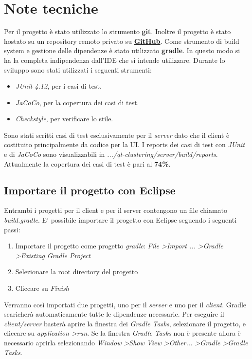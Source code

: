 \documentclass{article}
\begin{document}
	\section{Note tecniche}
	Per il progetto è stato utilizzato lo strumento \textbf{git}. Inoltre
	il progetto è stato hostato su un repository remoto privato su
	\href{https://github.com}{\textbf{GitHub}}. Come strumento di build
	system e gestione delle dipendenze è stato utilizzato \textbf{gradle}.
	In questo modo si ha la completa indipendenza dall'IDE che si intende
	utilizzare. 
	Durante lo sviluppo sono stati utilizzati i seguenti strumenti:
	\begin{itemize}
		\item \textit{JUnit 4.12}, per i casi di test.
		\item \textit{JaCoCo}, per la copertura dei casi di test.
		\item \textit{Checkstyle}, per verificare lo stile.
	\end{itemize}
	Sono stati scritti casi di test esclusivamente per il \textit{server}
	dato che il client è costituito principalmente da codice per la UI.
	I reports dei casi di test con \textit{JUnit} e di \textit{JaCoCo} sono
	visualizzabili in \textit{.../qt-clustering/server/build/reports}.
	Attualmente la copertura dei casi di test è pari al \textbf{74\%}.

	\subsection {Importare il progetto con Eclipse}
	Entrambi i progetti per il client e per il server contengono un file
	chiamato \textit{build.gradle}. E' possibile importare il progetto con
	Eclipse seguendo i seguenti passi:
	\begin{enumerate}
		\item Importare il progetto come progetto \textit{gradle}:
			\textit{File \textgreater Import ... \textgreater Gradle
			\textgreater Existing Gradle Project}
		\item Selezionare la root directory del progetto
		\item Cliccare su \textit{Finish}
	\end{enumerate}
	Verranno così importati due progetti, uno per il \textit{server} e uno
	per il \textit{client}. Gradle scaricherà automaticamente tutte le
	dipendenze necessarie. Per eseguire il \textit{client/server} basterà
	aprire la finestra dei \textit{Gradle Tasks}, selezionare il progetto,
	e cliccare su \textit{application \textgreater run}. Se la finestra
	\textit{Gradle Tasks} non è presente allora è necessario aprirla
	selezionando \textit{Window \textgreater Show View \textgreater Other...
	\textgreater Gradle \textgreater Gradle Tasks}.
\end{document}
